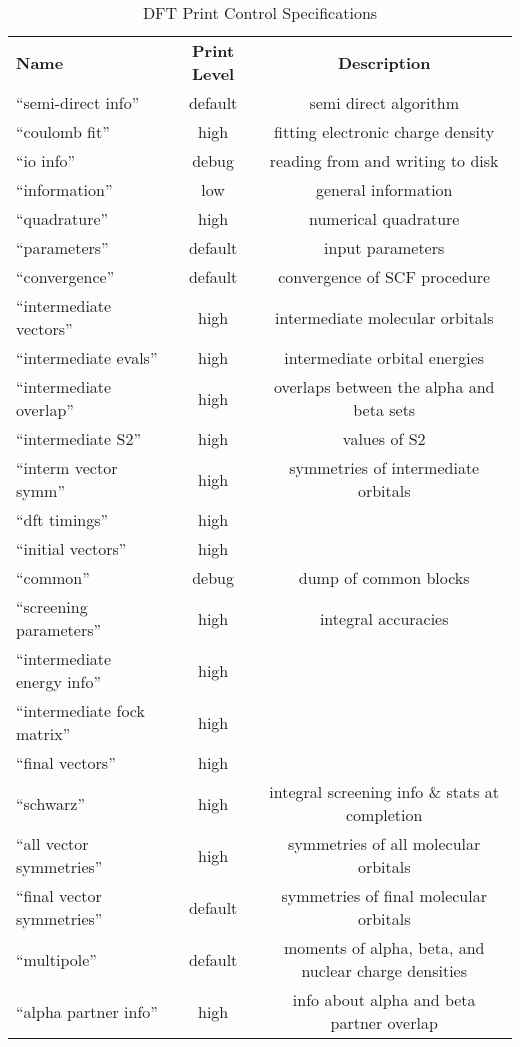 \begin{table}[htbp]
\begin{center}
\begin{tabular}{lcc}
  {\bf Name}          & {\bf Print Level} & {\bf Description} \\
 ``semi-direct info''               & default     & semi direct algorithm \\
 ``coulomb fit''                    & high        & fitting electronic charge density \\
 ``io info''                        & debug       & reading from and writing to disk  \\
 ``information''                    & low         & general information  \\
 ``quadrature''                     & high        & numerical quadrature  \\
 ``parameters''                     & default     & input parameters \\
 ``convergence''                    & default     & convergence of SCF procedure \\
 ``intermediate vectors''           & high        & intermediate molecular orbitals \\
 ``intermediate evals''             & high        & intermediate orbital energies \\
 ``intermediate overlap''           & high        & overlaps between the alpha and beta sets \\
 ``intermediate S2''                & high        & values of S2 \\
 ``interm vector symm''             & high        & symmetries of intermediate orbitals \\
 ``dft timings''                    & high        & \\
 ``initial vectors''                & high        & \\
 ``common''                         & debug       & dump of common blocks \\
 ``screening parameters''           & high        & integral accuracies \\
 ``intermediate energy info''       & high        & \\
 ``intermediate fock matrix''       & high        & \\
 ``final vectors''                  & high        & \\
 ``schwarz''                        & high        & integral screening info \& stats at completion\\
 ``all vector symmetries''          & high        & symmetries of all molecular orbitals \\
 ``final vector symmetries''        & default     & symmetries of final molecular orbitals \\
 ``multipole''                      & default     & moments of alpha, beta, and nuclear charge densities \\
 ``alpha partner info''             & high        & info about alpha and beta partner overlap \\
\end{tabular}
\end{center}
\caption{DFT Print Control Specifications}
\end{table}




